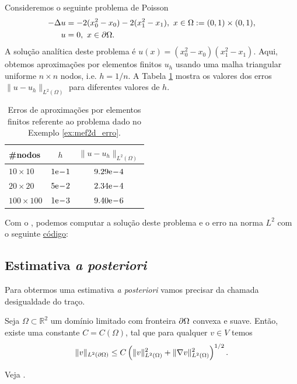 \begin{ex}\label{ex:mef2d_erro}
  Consideremos o seguinte problema de Poisson
  \begin{align}
    -\Delta u &= -2(x_0^2-x_0)-2(x_1^2-x_1),~x\in\Omega:=(0, 1)\times (0, 1),\\
    u &= 0,~x\in\partial\Omega.
  \end{align}
  A solução analítica deste problema é $u(x) = (x_0^2-x_0)(x_1^2-x_1)$. Aqui, obtemos aproximações por elementos finitos $u_h$ usando uma malha triangular uniforme $n\times n$ nodos, i.e. $h=1/n$. A Tabela \ref{tab:mef2d_erro} mostra os valores dos erros $\|u-u_h\|_{L^2(\Omega)}$ para diferentes valores de $h$.

  \begin{table}[h!]
    \centering
    \caption{Erros de aproximações por elementos finitos referente ao problema dado no Exemplo \ref{ex:mef2d_erro}.}
    \begin{tabular}{lc|c}
      \#nodos & $h$   & $\|u-u_h\|_{L^2(\Omega)}$ \\\hline
      $10\times 10$   & $1\mathrm{e}\!-\!1$  & $9.29\mathrm{e}\!-\!4$\\
      $20\times 20$   & $5\mathrm{e}\!-\!2$  & $2.34\mathrm{e}\!-\!4$\\
      $100\times 100$ & $1\mathrm{e}\!-\!3$ & $9.40\mathrm{e}\!-\!6$ \\\hline 
    \end{tabular}
    \label{tab:mef2d_erro}
  \end{table}

\ifispython
Com o \fenics, podemos computar a solução deste problema e o erro na norma $L^2$ com o seguinte \href{https://github.com/phkonzen/notas/blob/master/src/MetodoElementosFinitos/cap_mef2d/dados/ex_mef2d_erro/ex_mef2d_erro.py}{código}:

\fi
\end{ex}

\subsection{Estimativa {\it a posteriori}}
\badgeRevisar

Para obtermos uma estimativa {\it a posteriori} vamos precisar da chamada desigualdade do traço.

\begin{teo}
  Seja $\Omega\subset \mathbb{R}^2$ um domínio limitado com fronteira $\partial\Omega$ convexa e suave. Então, existe uma constante $C = C(\Omega)$, tal que para qualquer $v\in V$ temos
  \begin{equation}
    \|v\|_{L^2(\partial\Omega)} \leq C\left(\|v\|_{L^2(\Omega)}^2 + \|\nabla v\|_{L^2(\Omega)}^2\right)^{1/2}.
  \end{equation}
\end{teo}
\begin{dem}
  Veja \cite{Larson2013a}.
\end{dem}

